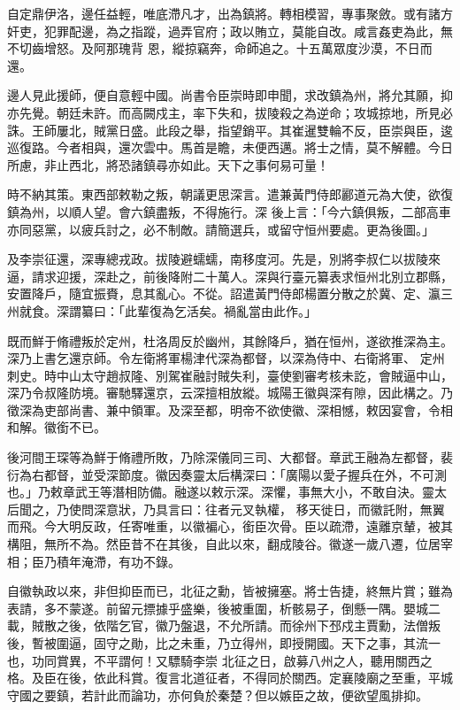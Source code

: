 \begin{pinyinscope}
 自定鼎伊洛，邊任益輕，唯底滯凡才，出為鎮將。轉相模習，專事聚斂。或有諸方奸吏，犯罪配邊，為之指蹤，過弄官府；政以賄立，莫能自改。咸言姦吏為此，無不切齒增怒。及阿那瑰背
 恩，縱掠竊奔，命師追之。十五萬眾度沙漠，不日而還。



 邊人見此援師，便自意輕中國。尚書令臣崇時即申聞，求改鎮為州，將允其願，抑亦先覺。朝廷未許。而高闕戍主，率下失和，拔陵殺之為逆命；攻城掠地，所見必誅。王師屢北，賊黨日盛。此段之舉，指望銷平。其崔暹雙輪不反，臣崇與臣，逡巡復路。今者相與，還次雲中。馬首是瞻，未便西邁。將士之情，莫不解體。今日所慮，非止西北，將恐諸鎮尋亦如此。天下之事何易可量！



 時不納其策。東西部敕勒之叛，朝議更思深言。遣兼黃門侍郎酈道元為大使，欲復鎮為州，以順人望。會六鎮盡叛，不得施行。深
 後上言：「今六鎮俱叛，二部高車亦同惡黨，以疲兵討之，必不制敵。請簡選兵，或留守恒州要處。更為後圖。」



 及李崇征還，深專總戎政。拔陵避蠕蠕，南移度河。先是，別將李叔仁以拔陵來逼，請求迎援，深赴之，前後降附二十萬人。深與行臺元纂表求恒州北別立郡縣，安置降戶，隨宜振賚，息其亂心。不從。詔遣黃門侍郎楊置分散之於冀、定、瀛三州就食。深謂纂曰：「此輩復為乞活矣。禍亂當由此作。」



 既而鮮于脩禮叛於定州，杜洛周反於幽州，其餘降戶，猶在恒州，遂欲推深為主。深乃上書乞還京師。令左衛將軍楊津代深為都督，以深為侍中、右衛將軍、
 定州刺史。時中山太守趙叔隆、別駕崔融討賊失利，臺使劉審考核未訖，會賊逼中山，深乃令叔隆防境。審馳驛還京，云深擅相放縱。城陽王徽與深有隙，因此構之。乃徵深為吏部尚書、兼中領軍。及深至都，明帝不欲使徽、深相憾，敕因宴會，令相和解。徽銜不已。



 後河間王琛等為鮮于脩禮所敗，乃除深儀同三司、大都督。章武王融為左都督，裴衍為右都督，並受深節度。徽因奏靈太后構深曰：「廣陽以愛子握兵在外，不可測也。」乃敕章武王等潛相防備。融遂以敕示深。深懼，事無大小，不敢自決。靈太后聞之，乃使問深意狀，乃具言曰：往者元叉執權，
 移天徙日，而徽託附，無翼而飛。今大明反政，任寄唯重，以徽褊心，銜臣次骨。臣以疏滯，遠離京輦，被其構阻，無所不為。然臣昔不在其後，自此以來，翻成陵谷。徽遂一歲八遷，位居宰相；臣乃積年淹滯，有功不錄。



 自徽執政以來，非但抑臣而已，北征之勳，皆被擁塞。將士告捷，終無片賞；雖為表請，多不蒙遂。前留元摽據乎盛樂，後被重圍，析骸易子，倒懸一隅。嬰城二載，賊散之後，依階乞官，徽乃盤退，不允所請。而徐州下邳戍主賈勳，法僧叛後，暫被圍逼，固守之勛，比之未重，乃立得州，即授開國。天下之事，其流一也，功同賞異，不平謂何！又驃騎李崇
 北征之日，啟募八州之人，聽用關西之格。及臣在後，依此科賞。復言北道征者，不得同於關西。定襄陵廟之至重，平城守國之要鎮，若計此而論功，亦何負於秦楚？但以嫉臣之故，便欲望風排抑。




\end{pinyinscope}
